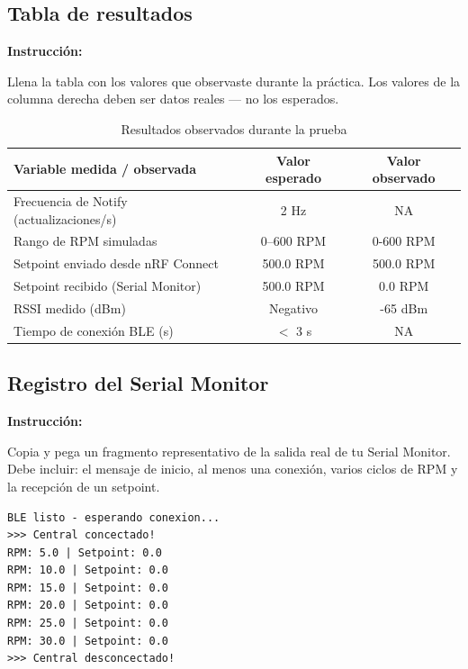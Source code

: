 \documentclass[12pt, letterpaper]{article}
\newenvironment{instruccion}{%
  \begin{mdframed}[
    backgroundcolor = tealLight,
    linecolor       = tealMain,
    linewidth       = 1pt,
    innerleftmargin = 10pt, innerrightmargin = 10pt,
    innertopmargin  = 6pt,  innerbottommargin= 6pt
  ]
  \small\color{tealMain}\textbf{Instrucción:}\hspace{4pt}\color{black}
}{%
  \end{mdframed}
}
\begin{document}
\subsection{Tabla de resultados}

\begin{instruccion}
  Llena la tabla con los valores que observaste durante la práctica.
  Los valores de la columna derecha deben ser datos reales — no los esperados.
\end{instruccion}

\begin{table}[H]
  \centering
  \caption{Resultados observados durante la prueba}
  \begin{tabular}{lcc}
    \toprule
    \textbf{Variable medida / observada} &
    \textbf{Valor esperado} &
    \textbf{Valor observado} \\
    \midrule
    Frecuencia de Notify (actualizaciones/s) & 2 Hz       & NA\hspace{4cm} \\[0.6em]
    Rango de RPM simuladas                   & 0–600 RPM  & 0-600 RPM \\[0.6em]
    Setpoint enviado desde nRF Connect       & 500.0 RPM  & 500.0 RPM \\[0.6em]
    Setpoint recibido (Serial Monitor)       & 500.0 RPM  & 0.0 RPM \\[0.6em]
    RSSI medido (dBm)                        & Negativo   & -65 dBm \\[0.6em]
    Tiempo de conexión BLE (s)               & $<$ 3 s    & NA \\[0.6em]
    \bottomrule
  \end{tabular}
\end{table}

\subsection{Registro del Serial Monitor}

\begin{instruccion}
  Copia y pega un fragmento representativo de la salida real de tu Serial
  Monitor. Debe incluir: el mensaje de inicio, al menos una conexión, varios
  ciclos de RPM y la recepción de un setpoint.
\end{instruccion}

\begin{lstlisting}[language={}, caption={Fragmento real del Serial Monitor}]
BLE listo - esperando conexion...
>>> Central concectado!
RPM: 5.0 | Setpoint: 0.0
RPM: 10.0 | Setpoint: 0.0
RPM: 15.0 | Setpoint: 0.0
RPM: 20.0 | Setpoint: 0.0
RPM: 25.0 | Setpoint: 0.0
RPM: 30.0 | Setpoint: 0.0
>>> Central desconcectado!
\end{lstlisting}
\end{document}

